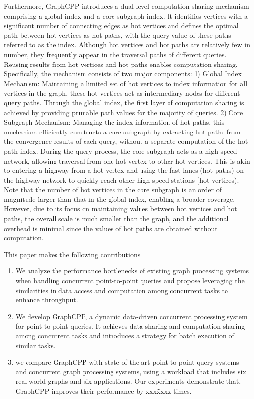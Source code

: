 \documentclass[lettersize,journal]{IEEEtran} %
\begin{document}
Furthermore, GraphCPP introduces a dual-level computation sharing mechanism comprising a global index and a core subgraph index. It identifies vertices with a significant number of connecting edges as hot vertices and defines the optimal path between hot vertices as hot paths, with the query value of these paths referred to as the index. Although hot vertices and hot paths are relatively few in number, they frequently appear in the traversal paths of different queries. Reusing results from hot vertices and hot paths enables computation sharing. Specifically, the mechanism consists of two major components: 1) Global Index Mechanism: Maintaining a limited set of hot vertices to index information for all vertices in the graph, these hot vertices act as intermediary nodes for different query paths. Through the global index, the first layer of computation sharing is achieved by providing prunable path values for the majority of queries. 2) Core Subgraph Mechanism: Managing the index information of hot paths, this mechanism efficiently constructs a core subgraph by extracting hot paths from the convergence results of each query, without a separate computation of the hot path index. During the query process, the core subgraph acts as a high-speed network, allowing traversal from one hot vertex to other hot vertices. This is akin to entering a highway from a hot vertex and using the fast lanes (hot paths) on the highway network to quickly reach other high-speed stations (hot vertices). Note that the number of hot vertices in the core subgraph is an order of magnitude larger than that in the global index, enabling a broader coverage. However, due to its focus on maintaining values between hot vertices and hot paths, the overall scale is much smaller than the graph, and the additional overhead is minimal since the values of hot paths are obtained without computation.


This paper makes the following contributions:
\begin{enumerate}
  \item{We analyze the performance bottlenecks of existing graph processing systems when handling concurrent point-to-point queries and propose leveraging the similarities in data access and computation among concurrent tasks to enhance throughput.}
  \item{We develop GraphCPP, a dynamic data-driven concurrent processing system for point-to-point queries. It achieves data sharing and computation sharing among concurrent tasks and introduces a strategy for batch execution of similar tasks.}
  \item{we compare GraphCPP with state-of-the-art point-to-point query systems and concurrent graph processing systems, using a workload that includes six real-world graphs\cite{snap}\cite{twitter}\cite{bubing}\cite{timeaware} and six applications\cite{ppsp_1}\cite{ppwp}\cite{ppnp}\cite{bfs}\cite{reachability_1}\cite{connectivity}. Our experiments demonstrate that, GraphCPP improves their performance by xxx\~xxxx times.}
\end{enumerate}
\end{document}
